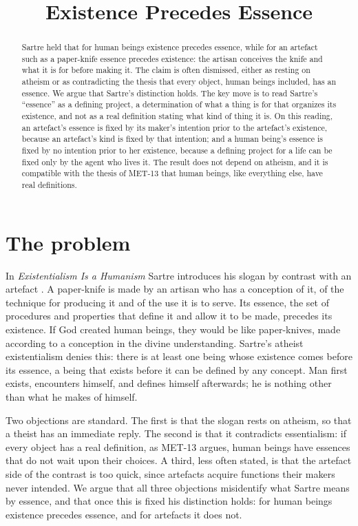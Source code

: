 \documentclass{situationist-preprint}
\title{Existence Precedes Essence}
\begin{document}
\maketitle

\begin{abstract}
Sartre held that for human beings existence precedes essence, while for an artefact such as a paper-knife essence precedes existence: the artisan conceives the knife and what it is for before making it. The claim is often dismissed, either as resting on atheism or as contradicting the thesis that every object, human beings included, has an essence. We argue that Sartre's distinction holds. The key move is to read Sartre's \enquote{essence} as a defining project, a determination of what a thing is for that organizes its existence, and not as a real definition stating what kind of thing it is. On this reading, an artefact's essence is fixed by its maker's intention prior to the artefact's existence, because an artefact's kind is fixed by that intention; and a human being's essence is fixed by no intention prior to her existence, because a defining project for a life can be fixed only by the agent who lives it. The result does not depend on atheism, and it is compatible with the thesis of MET-13 that human beings, like everything else, have real definitions.
\end{abstract}

\section{The problem}

In \emph{Existentialism Is a Humanism} Sartre introduces his slogan by contrast with an artefact \citep{Sartre1946}. A paper-knife is made by an artisan who has a conception of it, of the technique for producing it and of the use it is to serve. Its essence, the set of procedures and properties that define it and allow it to be made, precedes its existence. If God created human beings, they would be like paper-knives, made according to a conception in the divine understanding. Sartre's atheist existentialism denies this: there is at least one being whose existence comes before its essence, a being that exists before it can be defined by any concept. Man first exists, encounters himself, and defines himself afterwards; he is nothing other than what he makes of himself.

Two objections are standard. The first is that the slogan rests on atheism, so that a theist has an immediate reply. The second is that it contradicts essentialism: if every object has a real definition, as MET-13 argues, human beings have essences that do not wait upon their choices. A third, less often stated, is that the artefact side of the contrast is too quick, since artefacts acquire functions their makers never intended. We argue that all three objections misidentify what Sartre means by essence, and that once this is fixed his distinction holds: for human beings existence precedes essence, and for artefacts it does not.
\end{document}
